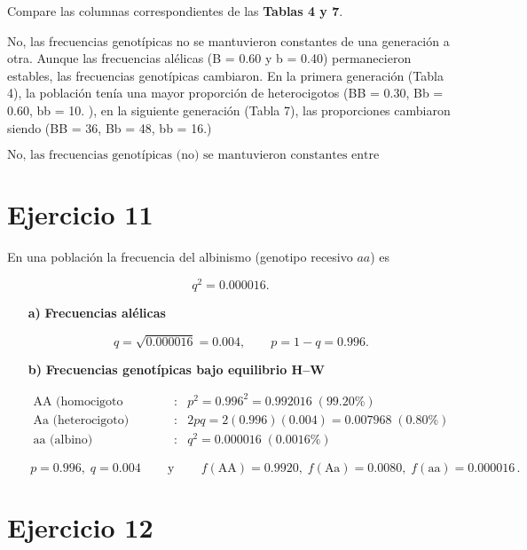 \documentclass{article}
\begin{document}
Compare las columnas correspondientes de las \textbf{Tablas 4 y 7}.

\bigskip

No, las frecuencias genotípicas no se mantuvieron constantes de una generación a otra. Aunque las frecuencias alélicas (B = 0.60 y b = 0.40) permanecieron estables, las frecuencias genotípicas cambiaron. En la primera generación (Tabla 4), la población tenía una mayor proporción de heterocigotos (BB = 0.30, Bb = 0.60, bb = 10. ), en la siguiente generación (Tabla 7), las proporciones cambiaron siendo (BB = 36, Bb = 48, bb = 16.)\\

\bigskip


\[\boxed{\text{No, las frecuencias genotípicas (no) se mantuvieron constantes entre generaciones.}}\]



\section*{Ejercicio 11}

En una población la frecuencia del albinismo (genotipo recesivo \(aa\)) es  

\[
q^{2} = 0.000016.
\]

\begin{enumerate}
\item[\textbf{a)}] \textbf{Frecuencias alélicas}

\[
q = \sqrt{0.000016}=0.004, 
\qquad 
p = 1-q = 0.996.
\]

\item[\textbf{b)}] \textbf{Frecuencias genotípicas bajo equilibrio H–W}

\[
\begin{array}{lcl}
\text{AA (homocigoto dominante)} &:& p^{2}       = 0.996^{2}=0.992016 \;(99.20\%) \\[2pt]
\text{Aa (heterocigoto)}         &:& 2pq         = 2(0.996)(0.004)=0.007968 \;(0.80\%) \\[2pt]
\text{aa (albino)}               &:& q^{2}       = 0.000016 \;(0.0016\%)
\end{array}
\]

\[
\boxed{\,p = 0.996,\; q = 0.004\,}
\qquad\text{y}\qquad
\boxed{\,f(\text{AA}) = 0.9920,\; f(\text{Aa}) = 0.0080,\; f(\text{aa}) = 0.000016\,}.
\]
\end{enumerate}

\section*{Ejercicio 12}
\end{document}
